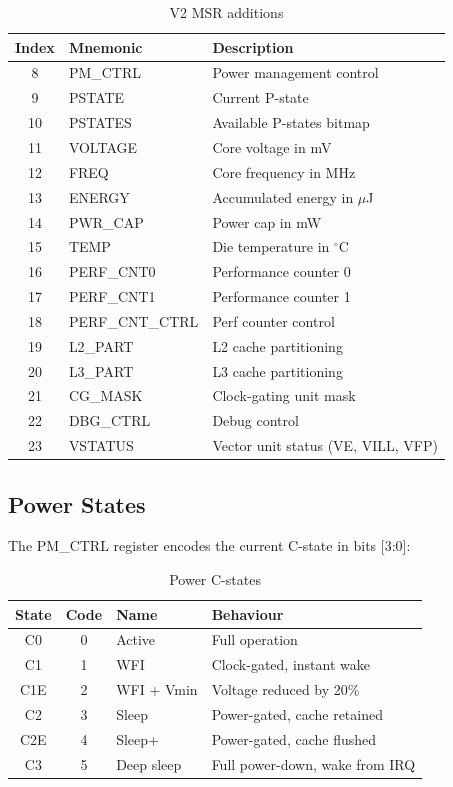 \documentclass[11pt,a4paper]{article}
\begin{document}
\begin{table}[H]
\centering
\caption{V2 MSR additions}
\begin{tabular}{cll}
\toprule
Index & Mnemonic & Description \\
\midrule
8  & PM\_CTRL   & Power management control \\
9  & PSTATE     & Current P-state \\
10 & PSTATES    & Available P-states bitmap \\
11 & VOLTAGE    & Core voltage in mV \\
12 & FREQ       & Core frequency in MHz \\
13 & ENERGY     & Accumulated energy in $\mu$J \\
14 & PWR\_CAP   & Power cap in mW \\
15 & TEMP       & Die temperature in $^\circ$C \\
16 & PERF\_CNT0 & Performance counter 0 \\
17 & PERF\_CNT1 & Performance counter 1 \\
18 & PERF\_CNT\_CTRL & Perf counter control \\
19 & L2\_PART   & L2 cache partitioning \\
20 & L3\_PART   & L3 cache partitioning \\
21 & CG\_MASK   & Clock-gating unit mask \\
22 & DBG\_CTRL  & Debug control \\
23 & VSTATUS   & Vector unit status (VE, VILL, VFP) \\
\bottomrule
\end{tabular}
\end{table}

\subsection{Power States}

The PM\_CTRL register encodes the current C-state in bits [3:0]:

\begin{table}[H]
\centering
\caption{Power C-states}
\begin{tabular}{ccll}
\toprule
State & Code & Name & Behaviour \\
\midrule
C0  & 0 & Active & Full operation \\
C1  & 1 & WFI & Clock-gated, instant wake \\
C1E & 2 & WFI + Vmin & Voltage reduced by 20\% \\
C2  & 3 & Sleep & Power-gated, cache retained \\
C2E & 4 & Sleep+ & Power-gated, cache flushed \\
C3  & 5 & Deep sleep & Full power-down, wake from IRQ \\
\bottomrule
\end{tabular}
\end{table}
\end{document}
